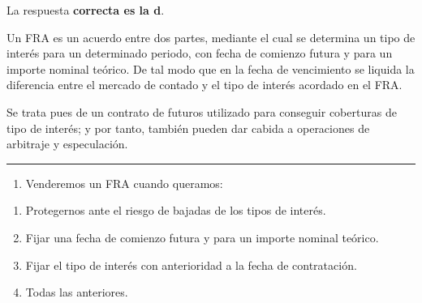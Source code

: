 \documentclass[
  letterpaper,
  DIV=11,
  numbers=noendperiod]{scrreprt}
\providecommand{\tightlist}{%
  \setlength{\itemsep}{0pt}\setlength{\parskip}{0pt}}\usepackage{longtable,booktabs,array}
\begin{document}
\begin{tcolorbox}[enhanced jigsaw, left=2mm, opacityback=0, colback=white, breakable, arc=.35mm, bottomrule=.15mm, rightrule=.15mm, toprule=.15mm, leftrule=.75mm, colframe=quarto-callout-tip-color-frame]
\begin{minipage}[t]{5.5mm}
\textcolor{quarto-callout-tip-color}{\faLightbulb}
\end{minipage}%
\begin{minipage}[t]{\textwidth - 5.5mm}

La respuesta \textbf{correcta es la d}.

Un FRA es un acuerdo entre dos partes, mediante el cual se determina un
tipo de interés para un determinado periodo, con fecha de comienzo
futura y para un importe nominal teórico. De tal modo que en la fecha de
vencimiento se liquida la diferencia entre el mercado de contado y el
tipo de interés acordado en el FRA.

Se trata pues de un contrato de futuros utilizado para conseguir
coberturas de tipo de interés; y por tanto, también pueden dar cabida a
operaciones de arbitraje y especulación.

\end{minipage}%
\end{tcolorbox}

\begin{center}\rule{0.5\linewidth}{0.5pt}\end{center}

\begin{enumerate}
\def\labelenumi{\arabic{enumi}.}
\setcounter{enumi}{46}
\tightlist
\item
  Venderemos un FRA cuando queramos:
\end{enumerate}

\begin{enumerate}
\def\labelenumi{\alph{enumi}.}
\item
  Protegernos ante el riesgo de bajadas de los tipos de interés.
\item
  Fijar una fecha de comienzo futura y para un importe nominal teórico.
\item
  Fijar el tipo de interés con anterioridad a la fecha de contratación.
\item
  Todas las anteriores.
\end{enumerate}
\end{document}
